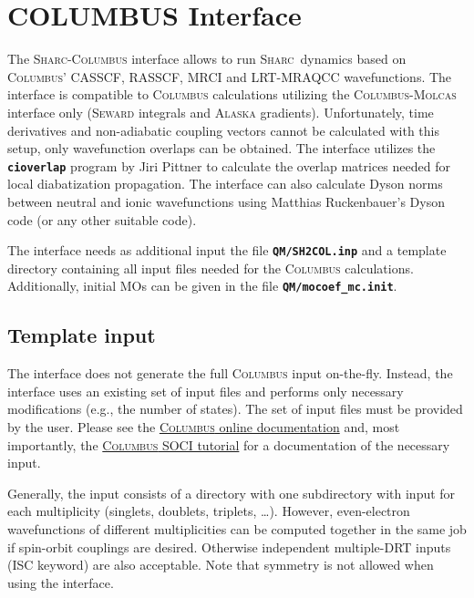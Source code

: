 \documentclass[a4paper,11pt,DIV=15,openany,twoside=false]{scrbook}
\newcommand{\sharc}{\textsc{Sharc}}
\newcommand{\ttt}[1]{\textbf{\texttt{#1}}}
\begin{document}

\section{COLUMBUS Interface}\label{sec:int:columbus}

The \sharc-\textsc{Columbus} interface allows to run \sharc\ dynamics based on \textsc{Columbus}' CASSCF, RASSCF, MRCI and LRT-MRAQCC wavefunctions. The interface is compatible to \textsc{Columbus} calculations utilizing the \textsc{Columbus}-\textsc{Molcas} interface only (\textsc{Seward} integrals and \textsc{Alaska} gradients). Unfortunately, time derivatives and non-adiabatic coupling vectors cannot be calculated with this setup, only wavefunction overlaps can be obtained. The interface utilizes the \ttt{cioverlap} program by Jiri Pittner \cite{Pittner2009CP} to calculate the overlap matrices needed for local diabatization propagation. The interface can also calculate Dyson norms between neutral and ionic wavefunctions using Matthias Ruckenbauer's Dyson code (or any other suitable code). 

The interface needs as additional input the file \ttt{QM/SH2COL.inp} and a template directory containing all input files needed for the \textsc{Columbus} calculations. Additionally, initial MOs can be given in the file \ttt{QM/mocoef\_mc.init}.

\subsection{Template input}

The interface does not generate the full \textsc{Columbus} input on-the-fly. Instead, the interface uses an existing set of input files and performs only necessary modifications (e.g., the number of states). The set of input files must be provided by the user. Please see the \href{http://www.univie.ac.at/columbus/docs_COL70/documentation_main.html}{\textsc{Columbus} online documentation} and, most importantly, the 
\href{http://www.univie.ac.at/columbus/docs_COL70/tutorial-SO.pdf}{\textsc{Columbus} SOCI tutorial} for a documentation of the necessary input.

Generally, the input consists of a directory with one subdirectory with input for each multiplicity (singlets, doublets, triplets, \dots). However, even-electron wavefunctions of different multiplicities can be computed together in the same job if spin-orbit couplings are desired. Otherwise independent multiple-DRT inputs (ISC keyword) are also acceptable. Note that symmetry is not allowed when using the interface.
\end{document}
